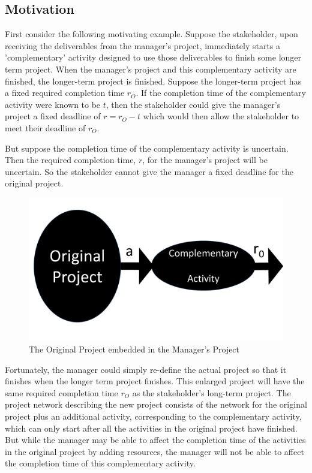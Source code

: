 \documentclass[11pt]{article}
\begin{document}
\subsection{Motivation}
First consider the following motivating example. Suppose the stakeholder, upon receiving the deliverables from the manager's project, immediately starts a 'complementary' activity designed to use those deliverables to finish some longer term project.  When the manager's project and this complementary activity are finished, the longer-term project is finished.   Suppose the longer-term project has a fixed required completion time $r_O$.   If the completion time of the complementary activity were known to be $t$, then the stakeholder could give the manager's project a fixed deadline of $r=r_O-t$ which would then allow the stakeholder to meet their deadline of $r_O$. \par
But suppose the completion time of the complementary activity is uncertain. Then the required completion time, $r$, for the manager’s project will be uncertain.   So the stakeholder cannot give the manager a fixed deadline for the original project.\par
\begin{figure}[h]
\begin{center}
\includegraphics[scale=0.30]{uncertaindeadlines.pdf}
\caption{The Original Project embedded in the Manager's Project}
\label{fixXscaled}
\end{center}
\end{figure}
          Fortunately, the manager could simply re-define the actual project so that it finishes when the longer term project finishes.    This enlarged project will have the same required completion time $r_O$ as the stakeholder's long-term project.   The project network describing the new project consists of the network for the original project plus an additional activity, corresponding to the complementary activity, which can only start after all the activities in the original project have finished.  But while the manager may be able to affect the completion time of the activities in the original project by adding resources, the manager will not be able to affect the completion time of this complementary activity. \par
\end{document}
